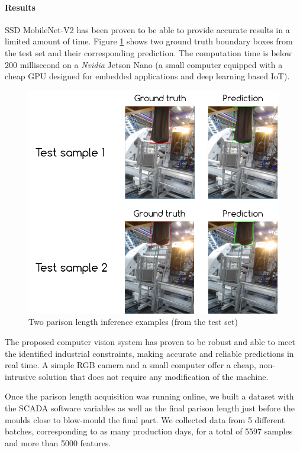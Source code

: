 \paragraph{Results}

SSD MobileNet-V2 has been proven to be able to provide accurate results in a limited amount of time. Figure \ref{fig:parison_inference} shows two ground truth boundary boxes from the test set and their corresponding prediction. The computation time is below $200$ millisecond on a \textit{Nvidia} Jetson Nano (a small computer equipped with a cheap GPU designed for embedded applications and deep learning based IoT).
%
\begin{figure}
\centerline{\includegraphics[scale=0.8]{images/chapter_3/parison_length_gt_prediction.png}}
\caption{Two parison length inference examples (from the test set)}
\label{fig:parison_inference}
\end{figure}
%
The proposed computer vision system has proven to be robust and able to meet the identified industrial constraints, making accurate and reliable predictions in real time. A simple RGB camera and a small computer offer a cheap, non-intrusive solution that does not require any modification of the machine. 

Once the parison length acquisition was running online, we built a dataset with the SCADA software variables as well as the final parison length just before the moulds close to blow-mould the final part. We collected data from 5 different batches, corresponding to as many production days, for a total of 5597 samples and more than 5000 features. 


